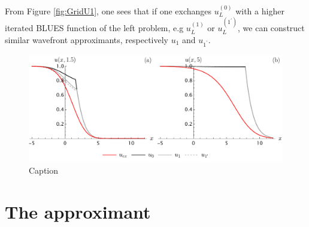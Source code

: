 \documentclass[amsmath,amssymb,amsfonts,aps,pre,preprint,superscriptaddress,bibnotes,showpacs,showkeys,longbibliography]{revtex4-1}
\begin{document}
From Figure \ref{fig:GridU1}, one sees that if one exchanges $u^{(0)}_{L}$ with a higher iterated BLUES function of the left problem, e.g $u^{(1)}_{L}$ or $u^{(1^\prime)}_{L}$, we can construct similar wavefront approximants, respectively $u_1$ and $u_{1^\prime}$. 
\begin{figure}[t]
    \centering
    \includegraphics[width=\linewidth]{Figures/PiecewiseApproxGridAlt.pdf}
    \caption{Caption}
    \label{fig:PiecewiseApproxGrid}
\end{figure}
\section{The approximant}\label{sec:The_approximant}
\end{document}
